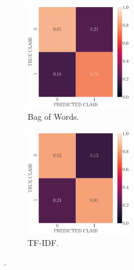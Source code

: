 \documentclass[11pt, a4 paper]{article}
\begin{document}
\begin{figure}[!htbp]
\centering
    \begin{subfigure}[!htbp]{0.24\textwidth}
       \centering
       \includegraphics[width=1.8in]{../results/ex4/conf_mtx_bog.pdf}
       \caption{Bag of Words.}
       \label{fig:bog}
    \end{subfigure}
\quad
    \begin{subfigure}[!htbp]{0.24\textwidth}
       \centering
       \includegraphics[width=1.8in]{../results/ex4/conf_mtx_tfidf.pdf}
       \caption{TF-IDF.}
       \label{fig:tfidf}
    \end{subfigure}
\caption{.}
\label{fig:ex4}
\end{figure}


\end{document}
